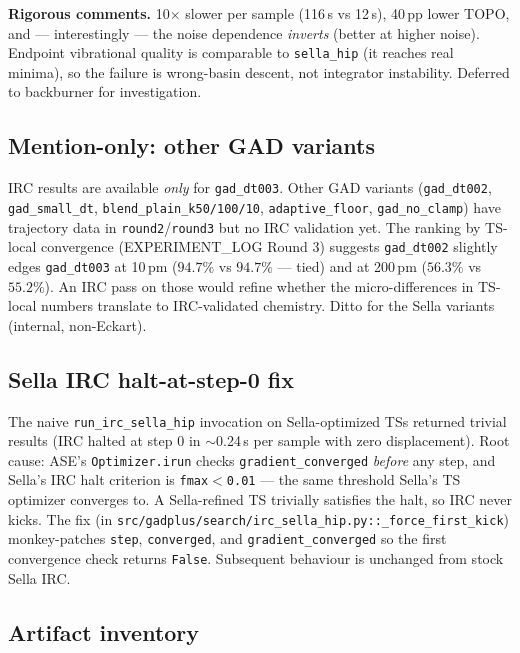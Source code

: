 \documentclass[11pt]{article}
\begin{document}
\textbf{Rigorous comments.} 10$\times$ slower per sample (116\,s vs
12\,s), 40\,pp lower TOPO, and --- interestingly --- the noise
dependence \emph{inverts} (better at higher noise). Endpoint vibrational
quality is comparable to \texttt{sella\_hip} (it reaches real minima),
so the failure is wrong-basin descent, not integrator instability.
Deferred to backburner for investigation.

\subsection{Mention-only: other GAD variants}

IRC results are available \emph{only} for \texttt{gad\_dt003}. Other
GAD variants (\texttt{gad\_dt002}, \texttt{gad\_small\_dt},
\texttt{blend\_plain\_k50/100/10}, \texttt{adaptive\_floor},
\texttt{gad\_no\_clamp}) have trajectory data in
\texttt{round2}/\texttt{round3} but no IRC validation yet. The ranking
by TS-local convergence (EXPERIMENT\_LOG Round 3) suggests
\texttt{gad\_dt002} slightly edges \texttt{gad\_dt003} at 10\,pm
($94.7\%$ vs $94.7\%$ --- tied) and at 200\,pm ($56.3\%$ vs $55.2\%$).
An IRC pass on those would refine whether the
micro-differences in TS-local numbers translate to IRC-validated
chemistry. Ditto for the Sella variants (internal, non-Eckart).

\subsection{Sella IRC halt-at-step-0 fix}

The naive \texttt{run\_irc\_sella\_hip} invocation on Sella-optimized
TSs returned trivial results (IRC halted at step 0 in $\sim$0.24\,s
per sample with zero displacement). Root cause: ASE's
\texttt{Optimizer.irun} checks \texttt{gradient\_converged} \emph{before}
any step, and Sella's IRC halt criterion is \texttt{fmax$<$0.01}
--- the same threshold Sella's TS optimizer converges to. A
Sella-refined TS trivially satisfies the halt, so IRC never kicks. The
fix (in \texttt{src/gadplus/search/irc\_sella\_hip.py::\_force\_first\_kick})
monkey-patches \texttt{step}, \texttt{converged}, and
\texttt{gradient\_converged} so the first convergence check returns
\texttt{False}. Subsequent behaviour is unchanged from stock Sella IRC.

\subsection{Artifact inventory}
\end{document}
